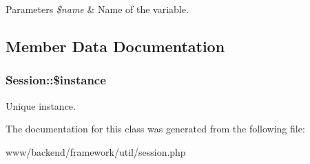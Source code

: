 \begin{DoxyParams}{Parameters}
{\em \$name} & Name of the variable. \\
\hline
\end{DoxyParams}


\subsection{Member Data Documentation}
\hypertarget{classSession_a86a6e52b2a48eeafaaff766db1973cef}{
\subsubsection[{\$instance}]{\setlength{\rightskip}{0pt plus 5cm}Session::\$instance}}
\label{classSession_a86a6e52b2a48eeafaaff766db1973cef}
Unique instance. 

The documentation for this class was generated from the following file:\begin{DoxyCompactItemize}
\item 
www/backend/framework/util/session.php\end{DoxyCompactItemize}
